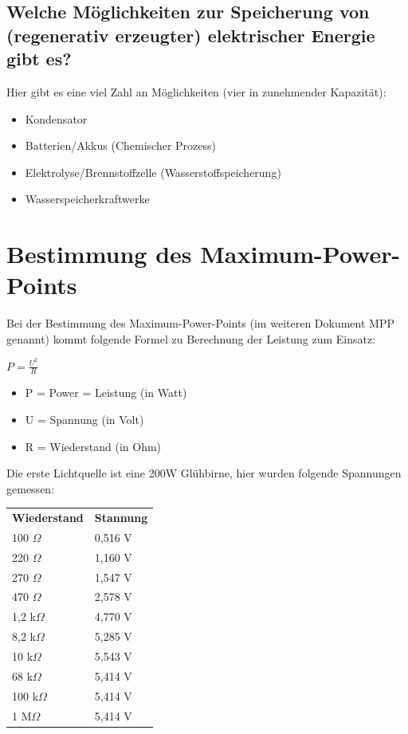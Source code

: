 \documentclass[a4paper,12pt]{article}
\begin{document}
\subsection{Welche Möglichkeiten zur Speicherung von (regenerativ erzeugter) elektrischer Energie gibt es?}
Hier gibt es eine viel Zahl an Möglichkeiten (vier in zunehmender Kapazität):
\begin{itemize}
 \item Kondensator
 \item Batterien/Akkus (Chemischer Prozess)
 \item Elektrolyse/Brennstoffzelle (Wasserstoffspeicherung)
 \item Wasserspeicherkraftwerke 
\end{itemize}


\section{Bestimmung des Maximum-Power-Points}
Bei der Bestimmung des Maximum-Power-Points (im weiteren Dokument MPP genannt) kommt folgende Formel zu Berechnung der Leistung zum Einsatz:\newline
\large \begin{center}
        $P = \frac{U^2}{R}$
       \end{center}
\small \begin{itemize}
    \item P = Power = Leistung (in Watt)
    \item U = Spannung (in Volt)
    \item R = Wiederstand (in Ohm)
\end{itemize} 
\normalsize Die erste Lichtquelle ist eine 200W Glühbirne, hier wurden folgende Spannungen gemessen:\newline
 \begin{tabular}{ll}
  \textbf{Wiederstand} & \textbf{Stannung} \\
  100 $ \Omega $ & 0,516 V \\
  220 $ \Omega $ & 1,160 V \\
  270 $ \Omega $ & 1,547 V \\
  470 $ \Omega $ & 2,578 V \\
  1,2 k$ \Omega $ & 4,770 V \\
  8,2 k$ \Omega $ & 5,285 V \\
  10 k$ \Omega $ & 5,543 V \\
  68 k$ \Omega $ & 5,414 V \\
  100 k$ \Omega $ & 5,414 V \\
  1 M$ \Omega $ & 5,414 V \\
 \end{tabular}
\end{document}
